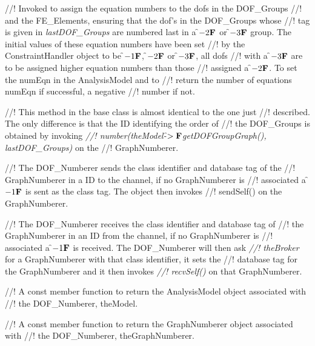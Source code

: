 //! Invoked to assign the equation numbers to the dofs in the DOF\_Groups
//! and the FE\_Elements, ensuring that the dof's in the DOF\_Groups whose
//! tag is given in {\em lastDOF\_Groups} are numbered last in a \f$-2{\bf F}$ or
\f$-3{\bf F}$ group. The initial values of these equation numbers have been set
//! by the ConstraintHandler object to be \f$-1{\bf F}$, \f$-2{\bf F}$ or \f$-3{\bf F}$, all dofs
//! with a \f$-3{\bf F}$ are to be assigned higher equation numbers than those
//! assigned a \f$-2{\bf F}$. To set the \p numEqn in the AnalysisModel and to
//! return the number of equations \p numEqn if successful, a negative
//! number if not.  

//! This method in the base class is almost identical to the one just
//! described. The only difference is that the ID identifying the order of
//! the DOF\_Groups is obtained by invoking {\em
//! number(theModel-\f$>{\bf F}$getDOFGroupGraph(), lastDOF\_Groups)} on the
//! GraphNumberer.



//! The DOF\_Numberer sends the class identifier and database tag of the
//! GraphNumberer in a ID to the channel, if no GraphNumberer is
//! associated a \f$-1{\bf F}$ is sent as the class tag. The object then invokes
//! sendSelf() on the GraphNumberer. 

//! The DOF\_Numberer receives the class identifier and database tag of
//! the GraphNumberer in an ID from the channel, if no GraphNumberer is
//! associated a \f$-1{\bf F}$ is received. The DOF\_Numberer will then ask {\em
//! theBroker} for a GraphNumberer with that class identifier, it sets the
//! database tag for the GraphNumberer and it then invokes {\em
//! recvSelf()} on that GraphNumberer.  

//! A const member function to return the AnalysisModel object associated with
//! the DOF\_Numberer, \p theModel.

//! A const member function to return the GraphNumberer object associated with
//! the DOF\_Numberer, \p theGraphNumberer.







